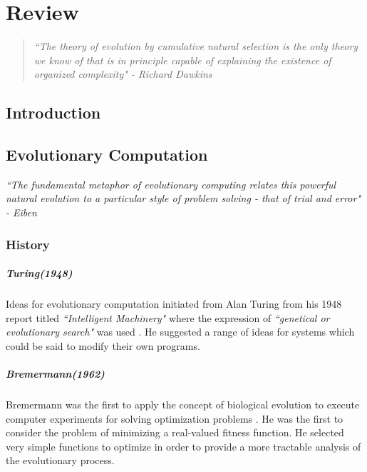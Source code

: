 \chapter{Review}

\begin{quote}
\textsl{``The theory of evolution by cumulative natural selection is the only theory we know of that is in principle capable of explaining the existence of organized complexity" - Richard Dawkins \cite{dawkins1996}}
\end{quote}

\section{Introduction}

\section{Evolutionary Computation}

\textsl{``The fundamental metaphor of evolutionary computing relates this powerful natural evolution to a particular style of problem solving - that of trial and error" - Eiben \cite{eiben2003}}

\subsection{History}
\label{subsec:evo-comp-history}

\paragraph{Turing(1948)}
Ideas for evolutionary computation initiated from Alan Turing from his 1948 report titled \textsl{``Intelligent Machinery"} where the expression of \textsl{``genetical or evolutionary search"}  was used \cite{turing1948}. He suggested a range of ideas for systems which could be said to modify their own programs. 

\paragraph{Bremermann(1962)}
Bremermann was the first to apply the concept of biological evolution to execute computer experiments for solving optimization problems \cite{bremermann1962}. He was the first to consider the problem of minimizing a real-valued fitness function. He selected very simple functions to optimize in order to provide a more tractable analysis of the evolutionary process.

